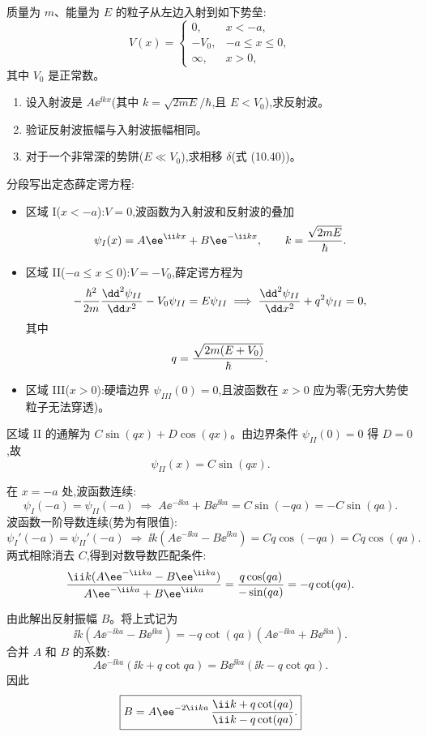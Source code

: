 \begin{question}
质量为 $m$、能量为 $E$ 的粒子从左边入射到如下势垒:
\[
V(x)=\begin{cases}
0,&x<-a,\\
-V_0,&-a\le x\le 0,\\
\infty,&x>0,
\end{cases}
\]
其中 $V_0$ 是正常数。
\begin{enumerate}
\item 设入射波是 $A\ee^{\ii kx}$(其中 $k=\sqrt{2mE}/\hbar$,且 $E<V_0$),求反射波。
\item 验证反射波振幅与入射波振幅相同。
\item 对于一个非常深的势阱($E\ll V_0$),求相移 $\delta$(式 (10.40))。
\end{enumerate}

\par\smallskip
{}

\begin{solution}
分段写出定态薛定谔方程:
\begin{itemize}
\item 区域 I($x<-a$):$V=0$,波函数为入射波和反射波的叠加
\[
\psi_I(x)=A\ee^{\ii kx}+B\ee^{-\ii kx},\qquad k={\sqrt{2mE}\over\hbar}.
\]
\item 区域 II($-a\le x\le 0$):$V=-V_0$,薛定谔方程为
\[
-{\hbar^2\over2m}{\dd^2\psi_{II}\over\dd x^2}-V_0\psi_{II}=E\psi_{II}
\;\Longrightarrow\;
{\dd^2\psi_{II}\over\dd x^2}+q^2\psi_{II}=0,
\]
其中
\[
q={\sqrt{2m(E+V_0)}\over\hbar}.
\]
\item 区域 III($x>0$):硬墙边界 $\psi_{III}(0)=0$,且波函数在 $x>0$ 应为零(无穷大势使粒子无法穿透)。
\end{itemize}

区域 II 的通解为 $C\sin(qx)+D\cos(qx)$。由边界条件 $\psi_{II}(0)=0$ 得 $D=0$,故
\[
\psi_{II}(x)=C\sin(qx).
\]

在 $x=-a$ 处,波函数连续:
\[
\psi_I(-a)=\psi_{II}(-a)\;\Longrightarrow\;A\ee^{-\ii ka}+B\ee^{\ii ka}=C\sin(-qa)=-C\sin(qa).
\]
波函数一阶导数连续(势为有限值):
\[
\psi_I'(-a)=\psi_{II}'(-a)\;\Longrightarrow\;
\ii k(A\ee^{-\ii ka}-B\ee^{\ii ka})=Cq\cos(-qa)=Cq\cos(qa).
\]
两式相除消去 $C$,得到对数导数匹配条件:
\[
{\ii k(A\ee^{-\ii ka}-B\ee^{\ii ka})\over A\ee^{-\ii ka}+B\ee^{\ii ka}}={q\cos(qa)\over-\sin(qa)}=-q\cot(qa).
\]

由此解出反射振幅 $B$。将上式记为
\[
\ii k(A\ee^{-\ii ka}-B\ee^{\ii ka})=-q\cot(qa)(A\ee^{-\ii ka}+B\ee^{\ii ka}).
\]
合并 $A$ 和 $B$ 的系数:
\[
A\ee^{-\ii ka}(\ii k+q\cot qa)=B\ee^{\ii ka}(\ii k-q\cot qa).
\]
因此
\[
\boxed{B=A\ee^{-2\ii ka}\,{\ii k+q\cot(qa)\over\ii k-q\cot(qa)}.}
\]


\end{solution}
\end{question}
